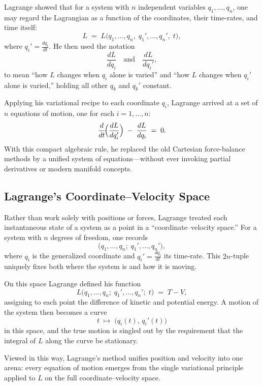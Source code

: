 Lagrange showed that for a system with \(n\) independent variables \(q_1,\dots,q_n\), one may regard the Lagrangian as a function of the coordinates, their time-rates, and time itself:
\[
L \;=\; L\bigl(q_1,\dots,q_n,\;q_1',\dots,q_n',\;t\bigr),
\]
where \(q_i'=\tfrac{dq_i}{dt}\).  He then used the notation
\[
\frac{dL}{dq_i}
\quad\text{and}\quad
\frac{dL}{dq_i'},
\]
to mean “how \(L\) changes when \(q_i\) alone is varied” and “how \(L\) changes when \(q_i'\) alone is varied,” holding all other \(q_k\) and \(q_k'\) constant.

Applying his variational recipe to each coordinate \(q_i\), Lagrange arrived at a set of \(n\) equations of motion, one for each \(i=1,\dots,n\):
\[
\frac{d}{dt}\!\Bigl(\frac{dL}{dq_i'}\Bigr)
\;-\;
\frac{dL}{dq_i}
\;=\;
0.
\]
With this compact algebraic rule, he replaced the old Cartesian force-balance methods by a unified system of equations—without ever invoking partial derivatives or modern manifold concepts.  



\subsection{Lagrange’s Coordinate–Velocity Space}

Rather than work solely with positions or forces, Lagrange treated each instantaneous state of a system as a point in a “coordinate–velocity space.”  For a system with \(n\) degrees of freedom, one records
\[
\bigl(q_1,\dots,q_n;\;q_1',\dots,q_n'\bigr),
\]
where \(q_i\) is the generalized coordinate and \(q_i'=\tfrac{dq_i}{dt}\) its time‐rate.  This \(2n\)-tuple uniquely fixes both where the system is and how it is moving.

\medskip

On this space Lagrange defined his function
\[
L\bigl(q_1,\dots,q_n;\;q_1',\dots,q_n';\;t\bigr)
\;=\;
T-V,
\]
assigning to each point the difference of kinetic and potential energy.  A motion of the system then becomes a curve
\[
t\;\longmapsto\;\bigl(q_i(t),\,q_i'(t)\bigr)
\]
in this space, and the true motion is singled out by the requirement that the integral of \(L\) along the curve be stationary.

\medskip

Viewed in this way, Lagrange’s method unifies position and velocity into one arena: every equation of motion emerges from the single variational principle applied to \(L\) on the full coordinate–velocity space.  


